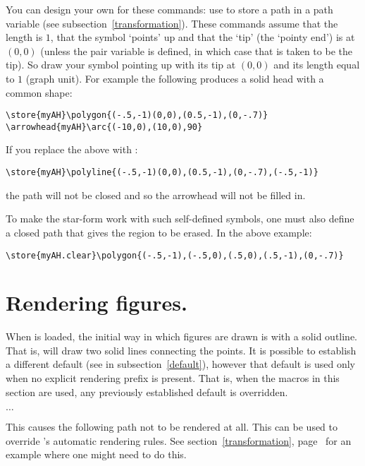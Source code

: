 \documentclass[letterpaper]{article}
\begin{document}
You can design your own  for these commands: use 
to store a path in a path variable (see
subsection~\ref{transformation}). These commands assume that the length
is $1$, that the symbol `points' up and that the `tip' (the `pointy
end') is at $(0,0)$ (unless the pair variable  is
defined, in which case that is taken to be the tip). So draw your symbol
pointing up with its tip at $(0,0)$ and its length equal to $1$ (graph
unit). For example the following produces a solid head with a common
shape:
\begin{verbatim}
\store{myAH}\polygon{(-.5,-1)(0,0),(0.5,-1),(0,-.7)}
\arrowhead{myAH}\arc{(-10,0),(10,0),90}
\end{verbatim}
If you replace the  above with :
\begin{verbatim}
\store{myAH}\polyline{(-.5,-1)(0,0),(0.5,-1),(0,-.7),(-.5,-1)}
\end{verbatim}
the path will not be closed and so the arrowhead will not be filled in.

To make the star-form work with such self-defined symbols, one must also
define a closed path  that gives the region to be
erased. In the above example:
\begin{verbatim}
\store{myAH.clear}\polygon{(-.5,-1),(-.5,0),(.5,0),(.5,-1),(0,-.7)}
\end{verbatim}


\section{Rendering figures.}\label{rendering}

When \mfp{} is loaded, the initial way in which figures are drawn is
with a solid outline. That is,  will
draw two solid lines connecting the points. It is possible to establish
a different default (see  in subsection~\ref{default}),
however that default is used only when no explicit rendering prefix is
present. That is, when the macros in this section are used, any
previously established default is overridden.

\begin{cd}
$\ldots$%
%
\end{cd}

This causes the following path not to be rendered at all. This can be
used to override \mfp{}'s automatic rendering rules. See
section~\ref{transformation}, page~\pageref{norenderexample} for an
example where one might need to do this.
\end{document}
